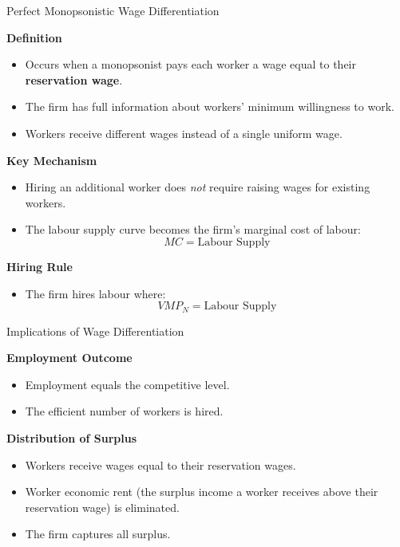 \documentclass[aspectratio=169]{beamer}
\begin{document}
\begin{frame}{Perfect Monopsonistic Wage Differentiation}

\textbf{Definition}
\begin{itemize}
\item Occurs when a monopsonist pays each worker a wage equal to their \textbf{reservation wage}.
\item The firm has full information about workers’ minimum willingness to work.
\item Workers receive different wages instead of a single uniform wage.
\end{itemize}

\textbf{Key Mechanism}
\begin{itemize}
\item Hiring an additional worker does \emph{not} require raising wages for existing workers.
\item The labour supply curve becomes the firm's marginal cost of labour:
\[
MC = \text{Labour Supply}
\]
\end{itemize}

\textbf{Hiring Rule}
\begin{itemize}
\item The firm hires labour where:
\[
VMP_N = \text{Labour Supply}
\]
\end{itemize}

\end{frame}

\begin{frame}{Implications of Wage Differentiation}

\textbf{Employment Outcome}
\begin{itemize}
\item Employment equals the competitive level.
\item The efficient number of workers is hired.
\end{itemize}

\textbf{Distribution of Surplus}
\begin{itemize}
\item Workers receive wages equal to their reservation wages.
\item Worker economic rent (the surplus income a worker receives above their reservation wage) is eliminated.
\item The firm captures all surplus.
\end{itemize}
\end{frame}
\end{document}

